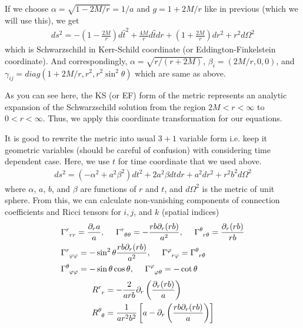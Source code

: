 \documentclass[a4paper,oneside,openany,11pt]{memoir}
\numberwithin{equation}{section} %
\begin{document}
If we choose $\alpha = \sqrt{1-2M/r} = 1/a$ and $g = 1+2M/r$ like in previous (which we will use this), we get
\begin{align}
ds^2 = - \left(1 - \frac{2M}{r} \right) d \hat{t}^2 + \frac{4M}{r} d \hat{t} dr + \left(1+\frac{2M}{r} \right) dr^2 + r^2 d\Omega^2
\end{align}
which is Schwarzschild in Kerr-Schild coordinate (or Eddington-Finkelstein coordinate). And correspondingly, $\alpha = \sqrt{r/(r+2M)}$, $\beta_i = (2M/r,0,0)$, and $\gamma_{ij} = diag(1+2M/r,r^2,r^2\sin^2 \theta)$ which are same as above.

As you can see here, the KS (or EF) form of the metric represents an analytic expansion of the Schwarzschild solution from the region $2M < r< \infty$ to  $0<r<\infty$. Thus, we apply this coordinate transformation for our equations.

It is good to rewrite the metric into usual $3+1$ variable form i.e. keep it geometric variables (should be careful of confusion) with considering time dependent case. Here, we use $t$ for time coordinate that we used above.
\begin{align}
\label{eqn:gen-sph-met}
ds^2 = (-\alpha^2 + a^2 \beta^2) dt^2 + 2a^2 \beta dt dr + a^2 dr^2 + r^2 b^2 d \Omega^2
\end{align}
where $\alpha$, $a$, $b$, and $\beta$ are functions of $r$ and $t$, and $d\Omega^2$ is the metric of unit sphere. From this, we can calculate non-vanishing components of connection coefficients and Ricci tensors for $i,j$, and $k$ (spatial indices)
\begin{align}
&\Gamma\indices{^r_{rr}} = \frac{\partial_r a}{a}, \,\,\,\,\,\,\,\, \Gamma\indices{^r_{\theta \theta}} = - \frac{rb \partial_r (rb)}{a^2}, \,\,\,\,\,\,\,\, \Gamma\indices{^\theta_{r \theta}} = \frac{\partial_r (rb)}{rb} \nonumber  \\
&\Gamma\indices{^r_{\varphi \varphi}} = -\sin^2 \theta \frac{rb \partial_r (rb)}{a^2}, \,\,\,\,\,\,\,\, \Gamma\indices{^\varphi_{r \varphi}} = \Gamma\indices{^\theta_{r \theta}} \nonumber \\
&\Gamma\indices{^\theta_{\varphi \varphi}} = -\sin \theta \cos \theta, \,\,\,\,\,\,\,\, \Gamma\indices{^\varphi_{\varphi \theta}} = -\cot \theta \nonumber 
\end{align}
\begin{align}
R\indices{^r_r} &= -\frac{2}{arb} \partial_r \left(\frac{\partial_r (rb)}{a} \right) \\
R\indices{^\theta_\theta} &= \frac{1}{ar^2b^2} \left[a-\partial_r \left(\frac{rb \partial_r (rb)}{a} \right) \right] \\
\end{align}
\end{document}

